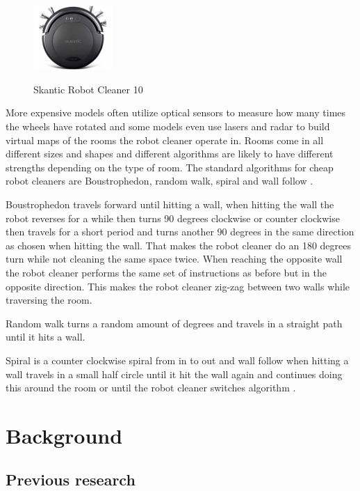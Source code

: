 \documentclass[bachelor]{kththesis}
\begin{document}
\begin{figure}[H]
	\includegraphics[width=3cm]{img/cheap.jpg}
	\centering
	\label{fig:skantic}
	\caption{Skantic Robot Cleaner 10 \parencite{scantic}}
\end{figure}

\noindent More expensive models often utilize optical sensors to measure how many times the 
wheels have rotated and some models even use lasers and radar to build virtual maps of the rooms the 
robot cleaner operate in.
Rooms come in all different sizes and shapes and different algorithms are likely to have different 
strengths depending on the type of room. The standard algorithms for cheap robot cleaners are 
Boustrophedon, random walk, spiral and wall follow \parencite{hasan}.

Boustrophedon travels forward until hitting a wall, when hitting the wall the robot reverses for a 
while then turns 90 degrees clockwise or counter clockwise then travels for a short period and turns
another 90 degrees in the same direction as chosen when hitting the wall.
That makes the robot cleaner do an 180 degrees turn while not cleaning the same space twice. 
When reaching the opposite wall the robot cleaner performs the same set of instructions as before 
but in the opposite direction. This makes the robot cleaner zig-zag between two walls while traversing the room.

Random walk turns a random amount of degrees and travels in a straight path until it hits a wall. 

Spiral is a counter clockwise spiral from in to out and wall follow when hitting a wall travels in 
a small half circle until it hit the wall again and continues doing this around the room or until 
the robot cleaner switches algorithm \parencite{hasan}. 




\chapter{Background}

\section{Previous research}
\end{document}
